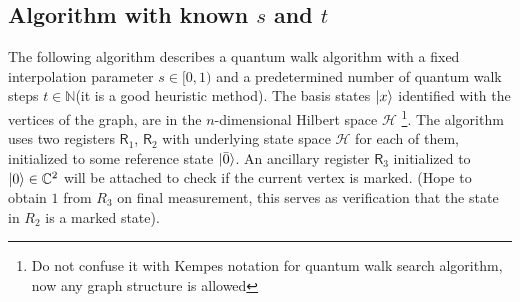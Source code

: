 \documentclass{article}
\newcommand{\Hi}{\mathcal{H}}
\newcommand{\bigO}[1]{\mathcal{O}\left( #1 \right)}
\newcommand{\bigObig}[1]{\mathcal{O}\big( #1 \big)}
\newcommand{\C}{\mathbb{C}}
\newcommand{\N}{\mathbb{N}}
\newcommand{\setup}{\mathtt{Setup}}
\newcommand{\update}{\mathtt{Update}}
\newcommand{\Reg}{\mathsf{R}}
\newcommand{\barO}{\bar{0}}
\begin{document}
\subsection{Algorithm with known $s$ and $t$}
The following algorithm describes a quantum walk algorithm with a fixed interpolation parameter  $ s\in [0,1) $ and a predetermined  number of   quantum walk steps $ t \in \N $(it is a good heuristic method).
The basis states $ \ket x $ identified with the vertices of the graph, are in the $n$-dimensional Hilbert space $\Hi$ \footnote{Do not confuse it with Kempes notation for quantum walk search algorithm, now any graph structure is allowed}. The algorithm uses two registers $\Reg_1$, $\Reg_2$ with underlying state space $\Hi$ for each of them,  initialized to some reference state $ \ket{\barO} $.
An ancillary register $\Reg_3$ initialized to $\ket{0} \in \C^2$ will be attached to check if the current vertex is marked. (Hope to obtain $1$ from $R_3$ on final measurement, this serves as verification that the state in $R_2$ is a marked state).
\end{document}
